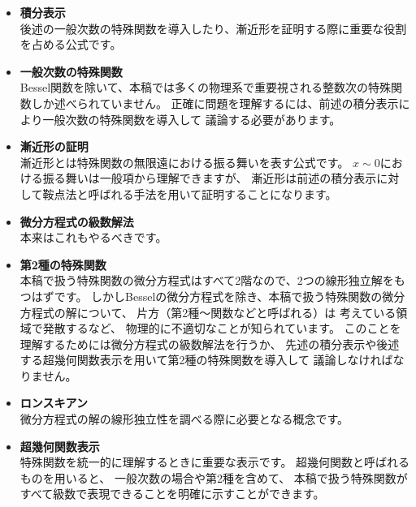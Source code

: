 \documentclass[../main/main]{subfiles}
\begin{document}
\begin{itemize}
  \item \textbf{積分表示}\\
  後述の一般次数の特殊関数を導入したり、漸近形を証明する際に重要な役割を占める公式です。\vspace{4pt}

  \item \textbf{一般次数の特殊関数}\\
  Bessel関数を除いて、本稿では多くの物理系で重要視される整数次の特殊関数しか述べられていません。
  正確に問題を理解するには、前述の積分表示により一般次数の特殊関数を導入して
  議論する必要があります。\vspace{4pt}

  \item\textbf{漸近形の証明}\\
  漸近形とは特殊関数の無限遠における振る舞いを表す公式です。
  $x\sim 0$における振る舞いは一般項から理解できますが、
  漸近形は前述の積分表示に対して鞍点法と呼ばれる手法を用いて証明することになります。\vspace{4pt}

  \item \textbf{微分方程式の級数解法}\\
  本来はこれもやるべきです。\vspace{4pt}

  \item \textbf{第2種の特殊関数}\\
  本稿で扱う特殊関数の微分方程式はすべて2階なので、2つの線形独立解をもつはずです。
  しかしBesselの微分方程式を除き、本稿で扱う特殊関数の微分方程式の解について、
  片方（第2種～関数などと呼ばれる）は  考えている領域で発散するなど、
  物理的に不適切なことが知られています。
  このことを理解するためには微分方程式の級数解法を行うか、
  先述の積分表示や後述する超幾何関数表示を用いて第2種の特殊関数を導入して
  議論しなければなりません。\vspace{4pt}

  \item \textbf{ロンスキアン}\\
  微分方程式の解の線形独立性を調べる際に必要となる概念です。\vspace{4pt}

  \item \textbf{超幾何関数表示}\\
  特殊関数を統一的に理解するときに重要な表示です。
  超幾何関数と呼ばれるものを用いると、  一般次数の場合や第2種を含めて、
  本稿で扱う特殊関数がすべて級数で表現できることを明確に示すことができます。\vspace{4pt}


\end{itemize}
\end{document}
